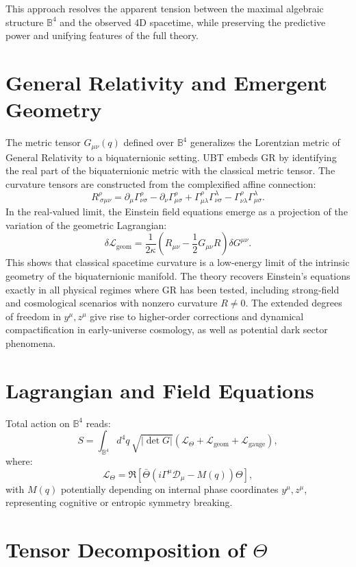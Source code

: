 \documentclass[12pt]{article}
\begin{document}
This approach resolves the apparent tension between the maximal algebraic structure \( \mathbb{B}^4 \) and the observed 4D spacetime, while preserving the predictive power and unifying features of the full theory.

\section{General Relativity and Emergent Geometry}

The metric tensor \( G_{\mu\nu}(q) \) defined over \( \mathbb{B}^4 \) generalizes the Lorentzian metric of General Relativity to a biquaternionic setting. UBT embeds GR by identifying the real part of the biquaternionic metric with the classical metric tensor. The curvature tensors are constructed from the complexified affine connection:
\[
R^\rho_{\ \sigma\mu\nu} = \partial_\mu \Gamma^\rho_{\nu\sigma} - \partial_\nu \Gamma^\rho_{\mu\sigma} + \Gamma^\rho_{\mu\lambda} \Gamma^\lambda_{\nu\sigma} - \Gamma^\rho_{\nu\lambda} \Gamma^\lambda_{\mu\sigma}.
\]
In the real-valued limit, the Einstein field equations emerge as a projection of the variation of the geometric Lagrangian:
\[
\delta \mathcal{L}_{\text{geom}} = \frac{1}{2\kappa} \left( R_{\mu\nu} - \frac{1}{2} G_{\mu\nu} R \right) \delta G^{\mu\nu}.
\]
This shows that classical spacetime curvature is a low-energy limit of the intrinsic geometry of the biquaternionic manifold. The theory recovers Einstein's equations exactly in all physical regimes where GR has been tested, including strong-field and cosmological scenarios with nonzero curvature $R \neq 0$. The extended degrees of freedom in \( y^\mu, z^\mu \) give rise to higher-order corrections and dynamical compactification in early-universe cosmology, as well as potential dark sector phenomena.
\section{Lagrangian and Field Equations}

Total action on \( \mathbb{B}^4 \) reads:
\[
S = \int_{\mathbb{B}^4} d^4q \, \sqrt{|\det G|} \left( \mathcal{L}_{\Theta} + \mathcal{L}_{\text{geom}} + \mathcal{L}_{\text{gauge}} \right),
\]
where:
\[
\mathcal{L}_{\Theta} = \Re\left[ \bar{\Theta} \left( i \Gamma^\mu \mathcal{D}_\mu - M(q) \right) \Theta \right],
\]
with \( M(q) \) potentially depending on internal phase coordinates \( y^\mu, z^\mu \), representing cognitive or entropic symmetry breaking.

\section{Tensor Decomposition of \(\Theta\)}
\end{document}
